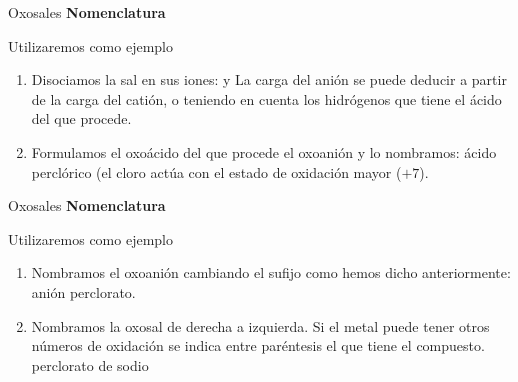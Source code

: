 \documentclass{beamer}
\newcommand*{\numberballmDarkTeal}{\protect\cnumero{\arabic*}{mDarkTeal}}
\newcommand{\examplebeamer}[1]{{\color{mLightGreen}\textbf{#1}}}
\begin{document}
\begin{frame}[t]{Oxosales}
    \examplebeamer{\Large Nomenclatura}

    Utilizaremos como ejemplo \textcolor{blue}{}
    \begin{enumerate}[label=\numberballmDarkTeal]
        \item Disociamos la sal en sus iones:  y 
              La carga del anión se puede deducir a partir de la carga del catión, o teniendo en cuenta los hidrógenos que tiene el ácido del que procede.
        \item Formulamos el oxoácido del que procede el oxoanión y lo nombramos:
               ácido perclórico (el cloro actúa con el estado de oxidación mayor ($+7$).
    \end{enumerate}
\end{frame}

\begin{frame}[t]{Oxosales}
    \examplebeamer{\Large Nomenclatura}

    Utilizaremos como ejemplo \textcolor{blue}{}
    \begin{enumerate}[label=\numberballmDarkTeal]
        \addtocounter{enumi}{2}
        \item Nombramos el oxoanión cambiando el sufijo como hemos dicho anteriormente:
              anión perclorato.
        \item Nombramos la oxosal de derecha a izquierda. Si el metal puede tener otros números de oxidación se indica entre paréntesis el que tiene el compuesto.
              perclorato de sodio
    \end{enumerate}
\end{frame}
\end{document}
